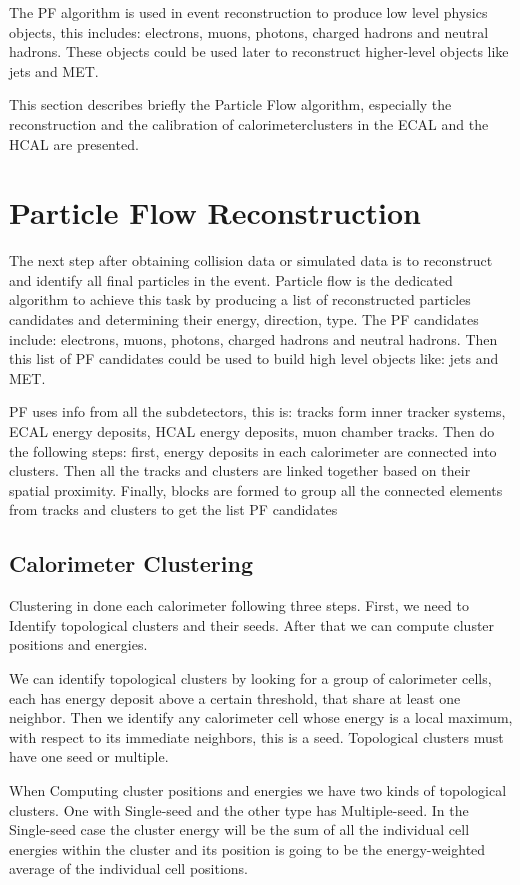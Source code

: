 The PF algorithm is used in event reconstruction to produce low level physics objects, this includes: electrons, muons, photons, charged hadrons and neutral hadrons. These objects could be used later to reconstruct higher-level objects like jets and MET.  
 
This section describes briefly the Particle Flow algorithm, especially the reconstruction and the calibration of calorimeterclusters in the ECAL and the HCAL are presented.  


\section{Particle Flow Reconstruction}

The next step after obtaining collision data or simulated data is to reconstruct and identify all final particles in the event. Particle flow is the dedicated algorithm to achieve this task by producing a list of reconstructed particles candidates and determining their energy, direction, type. The PF candidates include: electrons, muons, photons, charged hadrons and neutral hadrons. Then this list of PF candidates could be used to build high level objects like: jets and MET.  

PF uses info from all the subdetectors, this is: tracks form inner tracker systems, ECAL energy deposits, HCAL energy deposits, muon chamber tracks. Then do the following steps: first, energy deposits in each calorimeter are connected into clusters. Then all the tracks and clusters are linked together based on their spatial proximity. Finally, blocks are formed to group all the connected elements from tracks and clusters to get the list PF candidates

\subsection{Calorimeter Clustering}
Clustering in done each calorimeter following three steps. First, we need to Identify topological clusters and their seeds. After that we can compute cluster positions and energies.  

We can identify topological clusters by looking for a group of calorimeter cells, each has energy deposit above a certain threshold, that share at least one neighbor. Then we identify any calorimeter cell whose energy is a local maximum, with respect to its immediate neighbors, this is a seed. Topological clusters must have one seed or multiple. 

When Computing cluster positions and energies we have two kinds of topological clusters. One with Single-seed and the other type has Multiple-seed. In the Single-seed case the cluster energy will be the sum of all the individual cell energies within the cluster and its position is going to be the energy-weighted average of the individual cell positions. 

